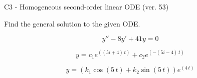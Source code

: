 \begin{exercise}
  \begin{exerciseTitle}C3 - Homogeneous second-order linear ODE (ver. 53)\end{exerciseTitle}
  \begin{exerciseStatement}
    
Find the general solution to the given ODE.

    
\[y''-8y'+41y = 0\]

  \end{exerciseStatement}
  \begin{exerciseAnswer}
    
\[y= c_{1} e^{\left(\left(5 i + 4\right) \, t\right)} + c_{2} e^{\left(-\left(5 i - 4\right) \, t\right)}\]

    
\[y= {\left(k_{1} \cos\left(5 \, t\right) + k_{2} \sin\left(5 \, t\right)\right)} e^{\left(4 \, t\right)}\]

  \end{exerciseAnswer}
\end{exercise}